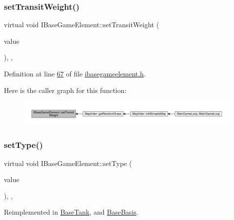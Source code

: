 \subsubsection{\texorpdfstring{set\+Transit\+Weight()}{setTransitWeight()}}
{\footnotesize\ttfamily virtual void I\+Base\+Game\+Element\+::set\+Transit\+Weight (\begin{DoxyParamCaption}\item[{\hyperlink{a00161}{Infinity\+Double} $\ast$}]{value }\end{DoxyParamCaption})\hspace{0.3cm}{\ttfamily [inline]}, {\ttfamily [virtual]}, {\ttfamily [inherited]}}



Definition at line \hyperlink{a00047_source_l00067}{67} of file \hyperlink{a00047_source}{ibasegameelement.\+h}.

Here is the caller graph for this function\+:
\nopagebreak
\begin{figure}[H]
\begin{center}
\leavevmode
\includegraphics[width=350pt]{d2/df5/a00137_ac480b8140b5b290f49b4b96a47291180_icgraph}
\end{center}
\end{figure}
\mbox{\label{a00137_a324cba2176155a50b5a2239eb0a8b6a0}} 
\subsubsection{\texorpdfstring{set\+Type()}{setType()}}
{\footnotesize\ttfamily virtual void I\+Base\+Game\+Element\+::set\+Type (\begin{DoxyParamCaption}\item[{int}]{value }\end{DoxyParamCaption})\hspace{0.3cm}{\ttfamily [inline]}, {\ttfamily [virtual]}, {\ttfamily [inherited]}}



Reimplemented in \hyperlink{a00157_a455ad8853248e1976e9d817eb55f102a}{Base\+Tank}, and \hyperlink{a00149_ac31b2ea48f47f1bc2baaf1971243b506}{Base\+Basis}.




